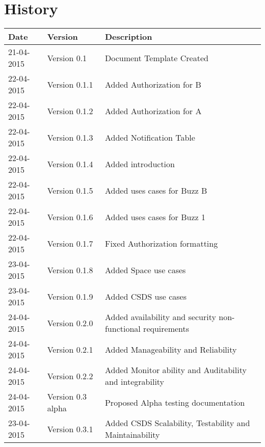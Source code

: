 \documentclass[12pt]{article}
\begin{document}


\section{History}
\begin{tabular}{|p{3cm}|p{5cm}|p{6cm}|}

\hline
Date & Version & Description\\ %
\hline
21-04-2015 & Version 0.1 & Document Template Created\\ %
\hline
22-04-2015 & Version 0.1.1 & Added Authorization for B\\ %
\hline
22-04-2015 & Version 0.1.2 & Added Authorization for A\\ %
\hline
22-04-2015 & Version 0.1.3 & Added Notification Table\\ %
\hline
22-04-2015 & Version 0.1.4 & Added introduction\\ %
\hline
22-04-2015 & Version 0.1.5 & Added uses cases for Buzz B\\ %
\hline
22-04-2015 & Version 0.1.6 & Added uses cases for Buzz 1\\ %
\hline
22-04-2015 & Version 0.1.7 & Fixed Authorization formatting\\ %
\hline
23-04-2015 & Version 0.1.8 & Added Space use cases\\ %
\hline
23-04-2015 & Version 0.1.9 & Added CSDS use cases\\ %
\hline
24-04-2015 & Version 0.2.0 & Added availability and security non-functional requirements\\ %
\hline
24-04-2015 & Version 0.2.1 & Added Manageability and Reliability\\ %
\hline
24-04-2015 & Version 0.2.2 & Added Monitor ability and Auditability and integrability\\ %
\hline
24-04-2015 & Version 0.3 alpha & Proposed Alpha testing documentation\\ %
\hline
23-04-2015 & Version 0.3.1 & Added CSDS Scalability, Testability and Maintainability\\ %
\hline
\end{tabular}
\end{document}
